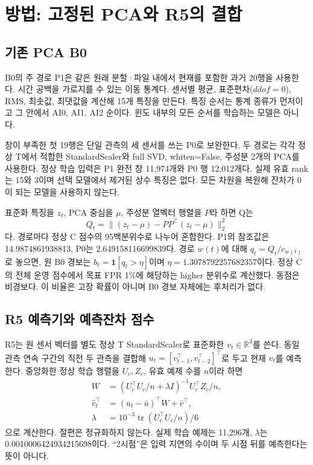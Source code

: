 \documentclass{article}
\newcommand{\ind}{\mathbf{1}}
\begin{document}
\section{방법: 고정된 PCA와 R5의 결합}
\subsection{기존 PCA B0}
B0의 주 경로 P1은 같은 원래 분할·파일 내에서 현재를 포함한 과거 20행을 사용한다. 시간 공백을 가로지를 수 있는 이동 통계다. 센서별 평균, 표준편차($ddof=0$), RMS, 최솟값, 최댓값을 계산해 15개 특징을 만든다. 특징 순서는 통계 종류가 먼저이고 그 안에서 AI0, AI1, AI2 순이다. 윈도 내부의 모든 순서를 학습하는 모델은 아니다.

창이 부족한 첫 19행은 단일 관측의 세 센서를 쓰는 P0로 보완한다. 두 경로는 각각 정상 T에서 적합한 StandardScaler와 full SVD, whiten=False, 주성분 2개의 PCA를 사용한다. 정상 학습 입력은 P1 완전 창 11,974개와 P0 행 12,012개다. 실제 유효 rank는 15와 3이며 선택 모델에서 제거된 상수 특징은 없다. 모든 차원을 복원해 잔차가 0이 되는 모델을 사용하지 않는다.

표준화 특징을 $z_t$, PCA 중심을 $\mu$, 주성분 열벡터 행렬을 $P$라 하면 Q는
\begin{equation}
Q_t=\|(z_t-\mu)-PP^\top(z_t-\mu)\|_2^2
\end{equation}
다. 경로마다 정상 C 점수의 95백분위수로 나누어 혼합한다. P1의 참조값은 14.9874861938813, P0는 2.649158116699839다. 경로 $w(t)$에 대해 $q_t=Q_t/c_{w(t)}$로 놓으면, 원 B0 경보는 $b_t=\ind[q_t>\eta]$이며 $\eta=1.3078792257682357$이다. 정상 C의 전체 운영 점수에서 목표 FPR 1\%에 해당하는 higher 분위수로 계산했다. 동점은 비경보다. 이 비율은 고장 확률이 아니며 B0 경보 자체에는 후처리가 없다.

\subsection{R5 예측기와 예측잔차 점수}
R5는 원 센서 벡터를 별도 정상 T StandardScaler로 표준화한 $v_t\in\mathbb R^3$를 쓴다. 동일 관측 연속 구간의 직전 두 관측을 결합해 $u_t=[v_{t-1}^\top,v_{t-2}^\top]^\top$로 두고 현재 $v_t$를 예측한다. 중앙화한 정상 학습 행렬을 $U_c,Z_c$, 유효 예제 수를 $n$이라 하면
\begin{align}
W&=(U_c^\top U_c/n+\lambda I)^{-1}U_c^\top Z_c/n,\\
\widehat v_t^\top&=(u_t-\bar u)^\top W+\bar v^\top,\\
\lambda&=10^{-3}\operatorname{tr}(U_c^\top U_c/n)/6
\end{align}
으로 계산한다. 절편은 정규화하지 않는다. 실제 학습 예제는 11,296개, $\lambda$는 0.0010006424934215698이다. ``2시점''은 입력 지연의 수이며 두 시점 뒤를 예측한다는 뜻이 아니다.
\end{document}
